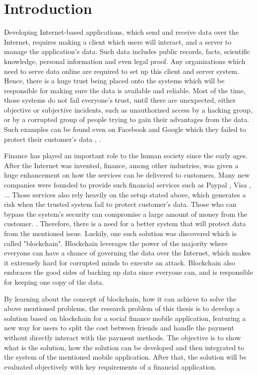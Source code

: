 \chapter{Introduction}
\label{ch:Introduction}

Developing Internet-based applications, which send and receive data over the Internet, requires making a client which users will interact, and a server to manage the application's data. Such data includes public records, facts, scientific knowledge, personal information and even legal proof. Any organizations which need to serve data online are required to set up this client and server system. Hence, there is a huge trust being placed onto the systems which will be responsible for making sure the data is available and reliable. Most of the time, those systems do not fail everyone's trust, until there are unexpected, either objective or subjective incidents, such as unauthorized access by a hacking group, or by a corrupted group of people trying to gain their advantages from the data. Such examples can be found even on Facebook and Google which they failed to protect their customer's data \citep{FacebookLeakData}, \citep{GoogleLeakData}.

Finance has played an important role to the human society since the early ages. After the Internet was invented, finance, among other industries, was given a huge enhancement on how the services can be delivered to customers. Many new companies were founded to provide such financial services such as Paypal \citep{Paypal}, Visa \citep{Visa}, ... Those services also rely heavily on the setup stated above, which generates a risk when the trusted system fail to protect customer's data. Those who can bypass the system's security can compromise a large amount of money from the customer. \citep{IndianBankHack}. Therefore, there is a need for a better system that will protect data from the mentioned issue. Luckily, one such solution was discovered which is called "blockchain". Blockchain leverages the power of the majority where everyone can have a chance of governing the data over the Internet, which makes it extremely hard for corrupted minds to execute an attack. Blockchain also embraces the good sides of backing up data since everyone can, and is responsible for keeping one copy of the data.

By learning about the concept of blockchain, how it can achieve to solve the above mentioned problems, the research problem of this thesis is to develop a solution based on blockchain for a social finance mobile application, featuring a new way for users to split the cost between friends and handle the payment without directly interact with the payment methods. The objective is to show what is the solution, how the solution can be developed and then integrated to the system of the mentioned mobile application. After that, the solution will be evaluated objectively with key requirements of a financial application.


